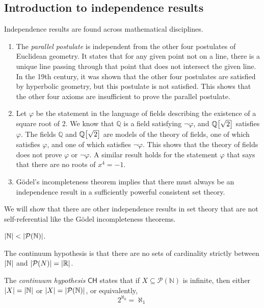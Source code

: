 \subsection{Introduction to independence results}
Independence results are found across mathematical disciplines.
\begin{enumerate}
    \item The \emph{parallel postulate} is independent from the other four postulates of Euclidean geometry.
    It states that for any given point not on a line, there is a unique line passing through that point that does not intersect the given line.
    In the 19th century, it was shown that the other four postulates are satisfied by hyperbolic geometry, but this postulate is not satisfied.
    This shows that the other four axioms are insufficient to prove the parallel postulate.
    \item Let \( \varphi \) be the statement in the language of fields describing the existence of a square root of 2.
    We know that \( \mathbb Q \) is a field satisfying \( \neg\varphi \), and \( \mathbb Q\qty[\sqrt{2}] \) satisfies \( \varphi \).
    The fields \( \mathbb Q \) and \( \mathbb Q\qty[\sqrt{2}] \) are models of the theory of fields, one of which satisfies \( \varphi \), and one of which satisfies \( \neg\varphi \).
    This shows that the theory of fields does not prove \( \varphi \) or \( \neg\varphi \).
    A similar result holds for the statement \( \varphi \) that says that there are no roots of \( x^4 = -1 \).
    \item G\"odel's incompleteness theorem implies that there must always be an independence result in a sufficiently powerful consistent set theory.
\end{enumerate}
We will show that there are other independence results in set theory that are not self-referential like the G\"odel incompleteness theorems.
\begin{theorem}[Cantor]
    \( \abs{\mathbb N} < \abs{\mathcal P(\mathbb N)} \).
\end{theorem}
The continuum hypothesis is that there are no sets of cardinality strictly between \( \abs{\mathbb N} \) and \( \abs{\mathcal P(N)} = \abs{\mathbb R} \).
\begin{definition}
    The \emph{continuum hypothesis} \( \mathsf{CH} \) states that if \( X \subseteq \mathcal P(\mathbb N) \) is infinite, then either \( \abs{X} = \abs{\mathbb N} \) or \( \abs{X} = \abs{\mathcal P(\mathbb N)} \), or equivalently,
    \[ 2^{\aleph_0} = \aleph_1 \]
\end{definition}
